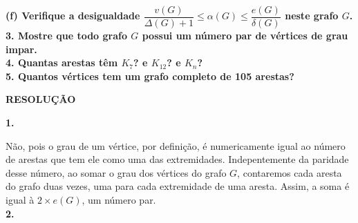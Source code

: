 \documentclass[12pt, a4paper]{article}
\begin{document}
\textbf{(f) Verifique a desigualdade \(\dfrac{v(G)}{\Delta(G) + 1} \leq \alpha(G) \leq \dfrac{e(G)}{\delta(G)}\) neste grafo \(G\).} \\

\textbf{3. Mostre que todo grafo \(G\) possui um número par de vértices de grau impar.} \\

\textbf{4. Quantas arestas têm \(K_7\)? e \(K_{12}\)? e \(K_n\)?} \\

\textbf{5. Quantos vértices tem um grafo completo de 105 arestas?} \\

\begin{center}
\textbf{RESOLUÇÃO}
\end{center}

\textbf{1.}


Não, pois o grau de um vértice, por definição, é numericamente igual ao número de arestas que tem ele como uma das extremidades. Indepentemente da paridade desse número, ao somar o grau dos vértices do grafo \(G\), contaremos cada aresta do grafo duas vezes, uma para cada extremidade de uma aresta.  Assim, a soma é igual à \(2 \times e(G)\), um número par. \\

\textbf{2.} \\
\end{document}
